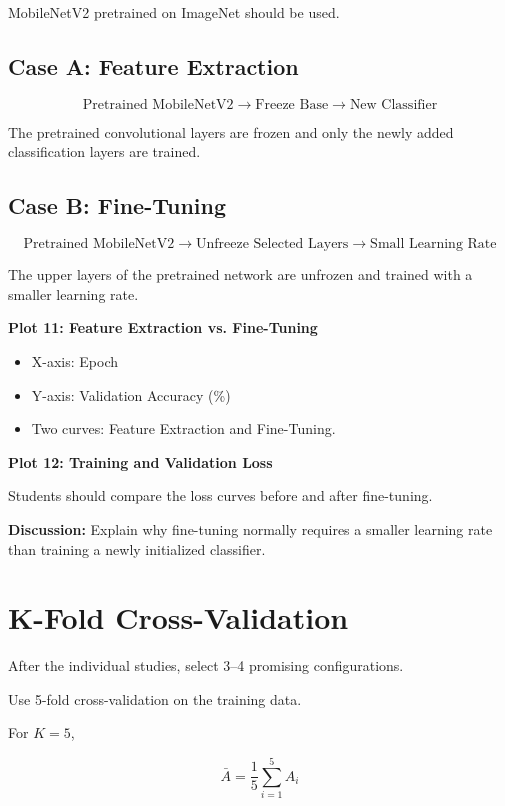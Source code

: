 \documentclass[10pt]{article}
\begin{document}
MobileNetV2 pretrained on ImageNet should be used.

\subsection*{Case A: Feature Extraction}

\[
\text{Pretrained MobileNetV2}
\rightarrow
\text{Freeze Base}
\rightarrow
\text{New Classifier}
\]

The pretrained convolutional layers are frozen and only the newly added
classification layers are trained.

\subsection*{Case B: Fine-Tuning}

\[
\text{Pretrained MobileNetV2}
\rightarrow
\text{Unfreeze Selected Layers}
\rightarrow
\text{Small Learning Rate}
\]

The upper layers of the pretrained network are unfrozen and trained with
a smaller learning rate.

\textbf{Plot 11: Feature Extraction vs. Fine-Tuning}

\begin{itemize}
\item X-axis: Epoch
\item Y-axis: Validation Accuracy (\%)
\item Two curves: Feature Extraction and Fine-Tuning.
\end{itemize}

\textbf{Plot 12: Training and Validation Loss}

Students should compare the loss curves before and after fine-tuning.

\textbf{Discussion:} Explain why fine-tuning normally requires a smaller
learning rate than training a newly initialized classifier.

\section{K-Fold Cross-Validation}

After the individual studies, select 3--4 promising configurations.

Use 5-fold cross-validation on the training data.

For $K=5$,

\[
\bar{A}=
\frac{1}{5}\sum_{i=1}^{5}A_i
\]
\end{document}
